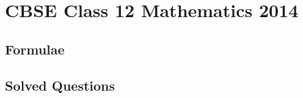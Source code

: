 \documentclass[journal]{IEEEtran}
\begin{document}
\newpage


\tableofcontents

\newpage
\onecolumn



\section{CBSE Class 12 Mathematics 2014}
\subsection{Formulae}

\subsection{Solved Questions}

\end{document}
